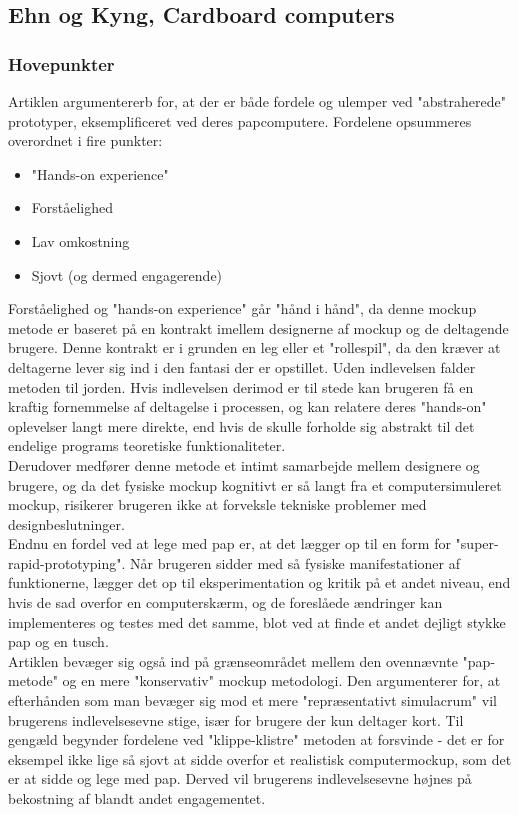 \documentclass[11pt]{article}
\begin{document}
\pagebreak
\subsection{Ehn og Kyng, Cardboard computers}
\subsubsection{Hovepunkter}
Artiklen argumentererb for, at der er både fordele og ulemper ved "abstraherede" prototyper, eksemplificeret ved deres papcomputere. Fordelene opsummeres overordnet i fire punkter:
\begin{itemize}
\item "Hands-on experience"
\item Forståelighed
\item Lav omkostning
\item Sjovt (og dermed engagerende)
\end{itemize}
Forståelighed og "hands-on experience" går "hånd i hånd", da denne mockup metode er baseret på en kontrakt imellem designerne af mockup og de deltagende brugere. Denne kontrakt er i grunden en leg eller et "rollespil", da den kræver at deltagerne lever sig ind i den fantasi der er opstillet. Uden indlevelsen falder metoden til jorden. Hvis indlevelsen derimod er til stede kan brugeren få en kraftig fornemmelse af deltagelse i processen, og kan relatere deres "hands-on" oplevelser langt mere direkte, end hvis de skulle forholde sig abstrakt til det endelige programs teoretiske funktionaliteter.\\
Derudover medfører denne metode et intimt samarbejde mellem designere og brugere, og da det fysiske mockup kognitivt er så langt fra et computersimuleret mockup, risikerer brugeren ikke at forveksle tekniske problemer med designbeslutninger.\\
Endnu en fordel ved at lege med pap er, at det lægger op til en form for "super-rapid-prototyping". Når brugeren sidder med så fysiske manifestationer af funktionerne, lægger det op til eksperimentation og kritik på et andet niveau, end hvis de sad overfor en computerskærm, og de foreslåede ændringer kan implementeres og testes med det samme, blot ved at finde et andet dejligt stykke pap og en tusch.\\
Artiklen bevæger sig også ind på grænseområdet mellem den ovennævnte "pap-metode" og en mere "konservativ" mockup metodologi. Den argumenterer for, at efterhånden som man bevæger sig mod et mere "repræsentativt simulacrum" vil brugerens indlevelsesevne stige, især for brugere der kun deltager kort. Til gengæld begynder fordelene ved "klippe-klistre" metoden at forsvinde - det er for eksempel ikke lige så sjovt at sidde overfor et realistisk computermockup, som det er at sidde og lege med pap. Derved vil brugerens indlevelsesevne højnes på bekostning af blandt andet engagementet.\\
\end{document}
